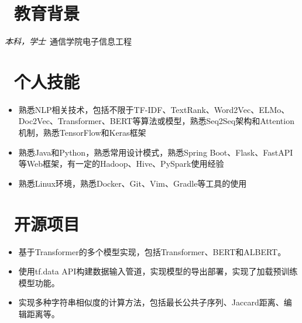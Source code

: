 \documentclass{resume}
\begin{document}


 
\section{\faGraduationCap\  教育背景}
\textit{本科，学士}\ 通信学院电子信息工程

\section{\faCogs\ 个人技能}
\begin{itemize}[parsep=0.5ex]
  \item 熟悉NLP相关技术，包括不限于TF-IDF、TextRank、Word2Vec、ELMo、Doc2Vec、Transformer、BERT等算法或模型，熟悉Seq2Seq架构和Attention机制，熟悉TensorFlow和Keras框架
 \item 熟悉Java和Python，熟悉常用设计模式，熟悉Spring Boot、Flask、FastAPI等Web框架，有一定的Hadoop、Hive、PySpark使用经验
 \item 熟悉Linux环境，熟悉Docker、Git、Vim、Gradle等工具的使用
\end{itemize}

\section{\faCode\ 开源项目}

\begin{itemize}
 \item 基于Transformer的多个模型实现，包括Transformer、BERT和ALBERT。
 \item 使用tf.data API构建数据输入管道，实现模型的导出部署，实现了加载预训练模型功能。
\end{itemize}

\begin{itemize}
 \item 实现多种字符串相似度的计算方法，包括最长公共子序列、Jaccard距离、编辑距离等。
\end{itemize}
\end{document}
